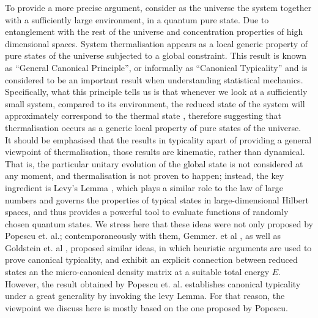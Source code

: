 \indent To provide a more precise argument, consider as the universe the system together with a sufficiently large environment, in a quantum pure state. Due to entanglement with the rest of the universe and concentration properties of high dimensional spaces. System thermalisation appears as a local generic property of pure states of the universe subjected to a global constraint. This result is known as ``General Canonical Principle'', or informally as ``Canonical Typicality'' and is considered to be an important result when understanding statistical mechanics. Specifically, what this principle tells us is that whenever we look at a sufficiently small system, compared to its environment, the reduced state of the system will approximately correspond to the thermal state \cite{popescu_foundations_2005, popescu_entanglement_2006, goldstein_canonical_2006, gemmer_quantum_2004},  therefore suggesting that thermalisation occurs as a generic local property of pure states of the universe.\\
\indent It should be emphasised that the results in typicality apart of providing a general viewpoint of thermalisation, those results are kinematic, rather than dynamical. That is, the particular unitary evolution of the global state is not considered at any moment, and thermalisation is not proven to happen; instead, the key ingredient is Levy's Lemma \cite{milman_asymptotic_2009, ledoux_concentration_2005}, which plays a similar role to the law of large numbers and governs the properties of typical states in large-dimensional Hilbert spaces\cite{popescu_foundations_2005}, and thus provides a powerful tool to evaluate functions of randomly chosen quantum states. We stress here that these ideas were not only proposed by Popescu et. al.; contemporaneously with them,  Gemmer. et al \cite{gemmer_quantum_2004}, as well as Goldstein et. al \cite{goldstein_canonical_2006}, proposed similar ideas, in which heuristic arguments are used to prove canonical typicality, and exhibit an explicit connection between reduced states an the micro-canonical density matrix at a suitable total energy $E$. However, the result obtained by Popescu et. al. establishes canonical typicality under a great generality by invoking the levy Lemma\cite{popescu_foundations_2005,milman_asymptotic_2009,ledoux_concentration_2005}. For that reason, the viewpoint we discuss here is mostly based on the one proposed by Popescu.\\   

